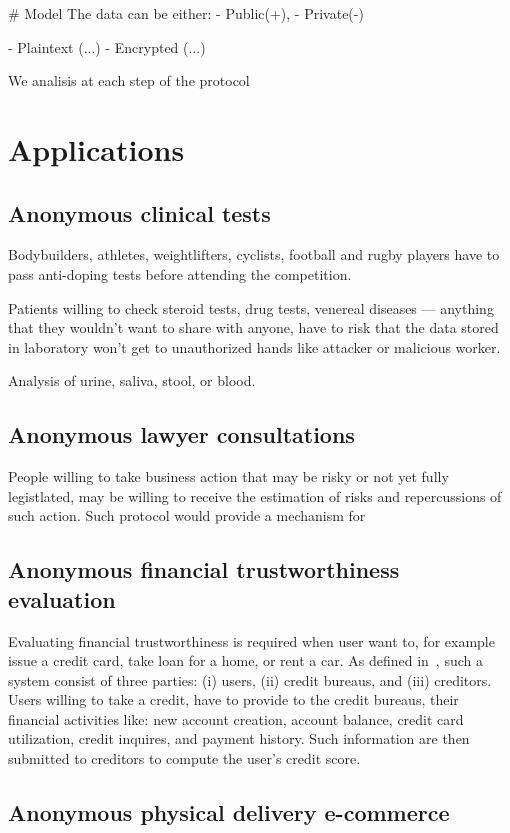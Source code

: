 \documentclass{article}
\begin{document}
# Model
The data can be either:
- Public(+), 
- Private(-)

- Plaintext (...)
- Encrypted (...)

We analisis at each step of the protocol

\section{Applications}
\subsection{Anonymous clinical tests}
Bodybuilders, athletes,  weightlifters, cyclists, football and rugby players have to pass anti-doping tests before attending the competition. 

Patients willing to check steroid tests, drug tests, venereal diseases — anything that they wouldn't want to share with anyone, have to risk that the data stored in laboratory won't get to unauthorized hands like attacker or malicious worker.

Analysis of urine, saliva, stool, or blood. 

\subsection{Anonymous lawyer consultations}

People willing to take business action that may be risky or not yet fully legistlated, may be willing to receive the estimation of risks and repercussions of such action.
Such protocol would provide a mechanism for 


\subsection{Anonymous financial trustworthiness evaluation}

Evaluating financial trustworthiness is required when user want to, for example issue a credit card, take loan for a home, or rent a car. 
As defined in~\cite{lin2021efficient}, such a system consist of three parties: (i) users, (ii) credit bureaus, and (iii) creditors. Users willing to take a credit, have to provide to the credit bureaus, their financial activities like: new account creation, account balance, credit card utilization, credit inquires, and payment history. Such information are then submitted to creditors to compute the user's credit score. 

\subsection{Anonymous physical delivery e-commerce}
~\cite{birjoveanu2015anonymity}
\end{document}
